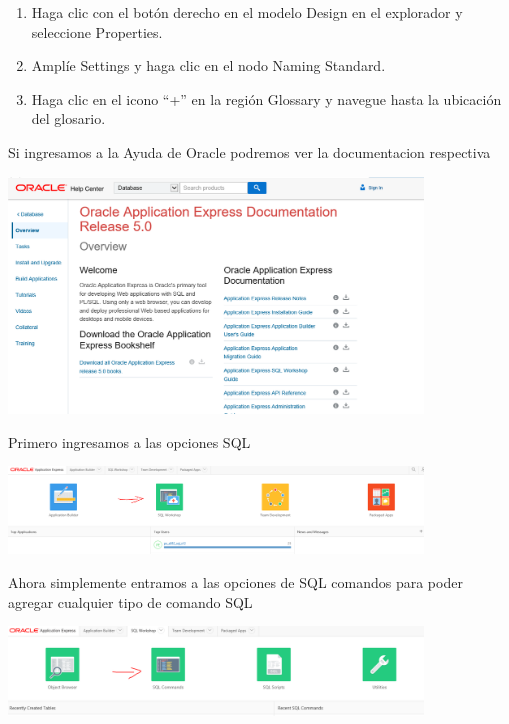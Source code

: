 \documentclass[a4paper,openright,12pt]{book}
\begin{document}
\begin{enumerate}
\item Haga clic con el botón derecho en el modelo Design en el explorador y seleccione Properties.
\item Amplíe Settings y haga clic en el nodo Naming Standard.
\item Haga clic en el icono “+” en la región Glossary y navegue hasta la ubicación del glosario.
\end{enumerate}

Si ingresamos a la Ayuda de Oracle podremos ver la documentacion respectiva\\
\begin{center}
\includegraphics[width=11cm]{./images/6-2 Ejercicio/1.png}\\
\end{center}

Primero ingresamos a las opciones SQL\\
\begin{center}
\includegraphics[width=11cm]{./images/6-2 Ejercicio/2.png}\\
\end{center}

Ahora simplemente entramos a las opciones de SQL comandos para poder agregar cualquier tipo de comando SQL\\
\begin{center}
\includegraphics[width=11cm]{./images/6-2 Ejercicio/3.png}\\
\end{center}
\end{document}
